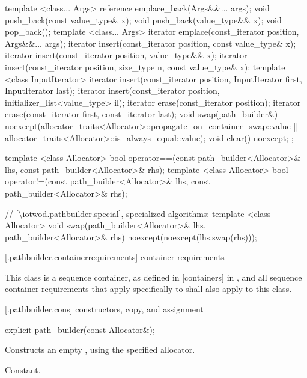 \begin{codeblock}
{{    template <class... Args>
    reference emplace_back(Args&&... args);
    void push_back(const value_type& x);
    void push_back(value_type&& x);
    void pop_back();
    template <class... Args>
    iterator emplace(const_iterator position, Args&&... args);
    iterator insert(const_iterator position, const value_type& x);
    iterator insert(const_iterator position, value_type&& x);
    iterator insert(const_iterator position, size_type n, const value_type& x);
    template <class InputIterator>
    iterator insert(const_iterator position, InputIterator first,
      InputIterator last);
    iterator insert(const_iterator position,
      initializer_list<value_type> il);
    iterator erase(const_iterator position);
    iterator erase(const_iterator first, const_iterator last);
    void swap(path_builder&)
      noexcept(allocator_traits<Allocator>::propagate_on_container_swap::value 
        || allocator_traits<Allocator>::is_always_equal::value);
    void clear() noexcept;
  };
  
  template <class Allocator>
  bool operator==(const path_builder<Allocator>& lhs, 
    const path_builder<Allocator>& rhs);
  template <class Allocator>
  bool operator!=(const path_builder<Allocator>& lhs, 
    const path_builder<Allocator>& rhs);
  
  // \ref{\iotwod.pathbuilder.special}, specialized algorithms:
  template <class Allocator>
  void swap(path_builder<Allocator>& lhs, path_builder<Allocator>& rhs)
    noexcept(noexcept(lhs.swap(rhs)));
}
\end{codeblock}

 [\iotwod.pathbuilder.containerrequirements] { container requirements}

\pnum
This class is a sequence container, as defined in [containers] in \cppseventeen, and all sequence container requirements that apply specifically to  shall also apply to this class.

 [\iotwod.pathbuilder.cons] { constructors, copy, and assignment}

%
\begin{itemdecl}
explicit path_builder(const Allocator&);
\end{itemdecl}
\begin{itemdescr}
\pnum
\effects
Constructs an empty , using the specified allocator.

\pnum
\complexity
Constant.
\end{itemdescr}

